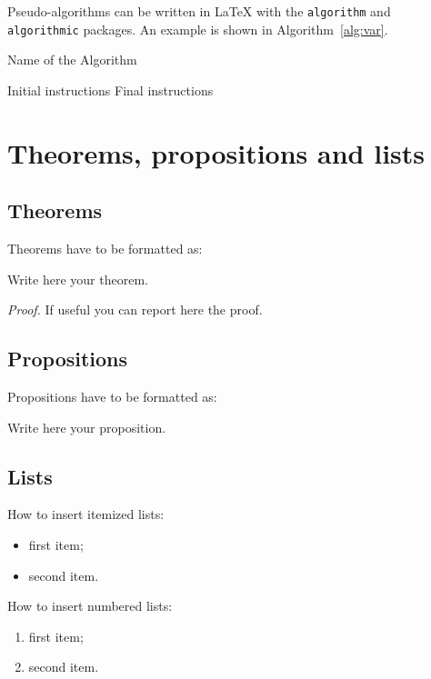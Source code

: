 \documentclass{Configuration_Files/PoliMi3i_thesis}
\begin{document}
Pseudo-algorithms can be written in \LaTeX{} with the \texttt{algorithm} and \texttt{algorithmic} packages.
An example is shown in Algorithm~\ref{alg:var}.
\begin{algorithm}[H]
\label{alg:example}
\caption{Name of the Algorithm}
\label{alg:var}
\label{protocol1}
\begin{algorithmic}[1]
\STATE Initial instructions
\ENDIF
\ENDFOR
{}
\ENDWHILE
\STATE Final instructions
\end{algorithmic}
\end{algorithm}

\vspace{5mm}

\section{Theorems, propositions and lists}

\subsection{Theorems}
Theorems have to be formatted as:
\begin{theorem}
\label{a_theorem}
Write here your theorem.
\end{theorem}
\textit{Proof.} If useful you can report here the proof.

\subsection{Propositions}
Propositions have to be formatted as:
\begin{proposition}
Write here your proposition.
\end{proposition}

\subsection{Lists}
How to insert itemized lists:
\begin{itemize}
\item first item;
\item second item.
\end{itemize}
How to insert numbered lists:
\begin{enumerate}
\item first item;
\item second item.
\end{enumerate}
\end{document}

